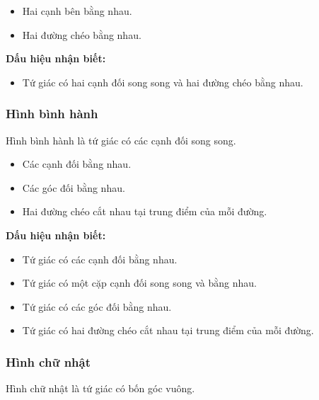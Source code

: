 \documentclass[12pt,a4paper]{article}
\begin{document}
\begin{tinhchat}
  \begin{itemize}
    \item Hai cạnh bên bằng nhau.
    \item Hai đường chéo bằng nhau.
  \end{itemize}
\end{tinhchat}

\medskip\noindent\textbf{Dấu hiệu nhận biết:}
\begin{itemize}
  \item Tứ giác có hai cạnh đối song song và hai đường chéo bằng nhau.
\end{itemize}

\subsubsection{Hình bình hành}

\begin{dinhnghia}
  Hình bình hành là tứ giác có các cạnh đối song song.
\end{dinhnghia}

\begin{tinhchat}
  \begin{itemize}
    \item Các cạnh đối bằng nhau.
    \item Các góc đối bằng nhau.
    \item Hai đường chéo cắt nhau tại trung điểm của mỗi đường.
  \end{itemize}
\end{tinhchat}

\medskip\noindent\textbf{Dấu hiệu nhận biết:}
\begin{itemize}
  \item Tứ giác có các cạnh đối bằng nhau.
  \item Tứ giác có một cặp cạnh đối song song và bằng nhau.
  \item Tứ giác có các góc đối bằng nhau.
  \item Tứ giác có hai đường chéo cắt nhau tại trung điểm của mỗi đường.
\end{itemize}

\subsubsection{Hình chữ nhật}

\begin{dinhnghia}
  Hình chữ nhật là tứ giác có bốn góc vuông.
\end{dinhnghia}
\end{document}

